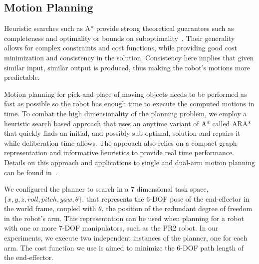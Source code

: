 \documentclass[letterpaper, 10 pt, conference]{ieeeconf}  %
\begin{document}
\subsection{Motion Planning}


Heuristic searches such as A* provide strong theoretical guarantees
such as completeness and optimality or bounds on
suboptimality~\cite{Pearl-heur}. Their generality allows for complex
constraints and cost functions, while providing good cost minimization
and consistency in the solution. Consistency here implies that given
similar input, similar output is produced, thus making the robot's
motions more predictable.

Motion planning for pick-and-place of moving objects needs to be
performed as fast as possible so the robot has enough time to execute
the computed motions in time. To combat the high dimensionality of the
planning problem, we employ a heuristic search based approach that
uses an anytime variant of A* called ARA*~\cite{LikGorThr-ara} that
quickly finds an initial, and possibly sub-optimal, solution and
repairs it while deliberation time allows. The approach also relies on
a compact graph representation and informative heuristics to provide
real time performance. Details on this approach and applications to single and dual-arm motion planning can be found in~\cite{Cohen2, Cohen3}. 

We configured the planner to search in a 7 dimensional task space, $\{{x, y, z, roll, pitch, yaw, \theta}\}$, that represents the 6-DOF pose of the end-effector in the world frame, coupled with $\theta$, the position of the redundant degree of freedom in the robot's arm. This representation can be used when planning for a robot with one or more 7-DOF manipulators, such as the PR2 robot. In our experiments, we execute two independent instances of the planner, one for each arm. The cost function we use is aimed to minimize the 6-DOF path length of the end-effector.
\end{document}
